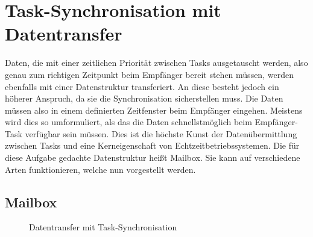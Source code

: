 \documentclass{llncs}
\begin{document}
\section{Task-Synchronisation mit Datentransfer}
Daten, die mit einer zeitlichen Priorität zwischen Tasks ausgetauscht werden, also genau zum richtigen Zeitpunkt beim Empfänger bereit stehen müssen, werden ebenfalls mit einer Datenstruktur transferiert. An diese besteht jedoch ein höherer Anspruch, da sie die Synchronisation sicherstellen muss. Die Daten müssen also in einem definierten Zeitfenster beim Empfänger eingehen.  Meistens wird dies so umformuliert, als das die Daten schnellstmöglich beim Empfänger-Task verfügbar sein müssen. Dies ist die höchste Kunst der Datenübermittlung zwischen Tasks und eine Kerneigenschaft von Echtzeitbetriebssystemen. Die für diese Aufgabe gedachte Datenstruktur heißt Mailbox. Sie kann auf verschiedene Arten funktionieren, welche nun vorgestellt werden.
\subsection{Mailbox}
\begin{figure}[h]
	\centering
	\begin{subfigure}{.40\columnwidth} %
		\def\svgwidth{\columnwidth}
		
	\end{subfigure}
	\caption{\label{fig:Mailbox_gesamt}Datentransfer mit Task-Synchronisation \autocite[vgl.][99]{Cooling2017}}
\end{figure}
\end{document}
